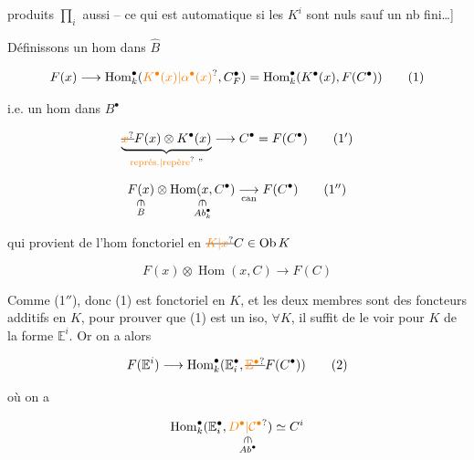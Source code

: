 
produits $\prod_{i}$ aussi -- ce qui est  automatique si les $K^i$ sont nuls sauf un nb fini…]


Définissons un hom dans $\widehat B$

\[
 F(x)\longrightarrow\operatorname{Hom}^{\bullet}_{k}(\unsure{K^{\bullet}(x)|\alpha^{\bullet}(x)},C^{\bullet}_{F})=\operatorname{Hom}^{\bullet}_{k}(K^{\bullet}(x),F(C^{\bullet})) \tag*{(1)}
\]

i.e. un hom dans $B^{\bullet}$

\[
 \underbrace{\deleted{\unsure{x}}F(x)\otimes K^{\bullet}(x)}_{\text{\unsure{représ.|repère}\ \textquotedblright}}\longrightarrow C^{\bullet}=F(C^{\bullet}) \tag*{(1$'$)}
\]


\[
 \underset{\substack{\rotatebox{-90}{$\in$}\\ B}}{F(x)}\otimes
 \underset{\substack{\rotatebox{-90}{$\in$}\\ Ab_k^{\bullet}}}{\operatorname{Hom}(x,C^{\bullet})}
 \underset{\mathrm{can}}{\longrightarrow}F(C^{\bullet}) \tag*{(1$''$)}
\]

qui provient de l'hom fonctoriel en $\deleted{\unsure{K|x}}C\in\operatorname{Ob}K$

\[
 F(x)\otimes\operatorname{Hom}(x,C)\longrightarrow F(C)
\]

Comme (1$''$), donc (1) est fonctoriel en $K$, et les deux membres sont des foncteurs additifs en $K$, pour prouver que  (1) est un iso, $\forall K$, il suffit de le voir pour $K$ de la forme  $\mathbb E^i$. Or on a alors

\[
 F(\mathbb E^i)\longrightarrow\operatorname{Hom}^{\bullet}_{k}(\mathbb E_i^{\bullet},\deleted{\unsure{\mathbb E^{\bullet}}}F(C^{\bullet})) \tag*{(2)}
\]

où on a 

\[
 \operatorname{Hom}^{\bullet}_{k}(\mathbb E_i^{\bullet},\underset{\substack{\rotatebox{-90}{$\in$}\\Ab^{\bullet}}}{\unsure{D^{\bullet}|\mathcal C^{\bullet}}})\simeq C^i
\]

